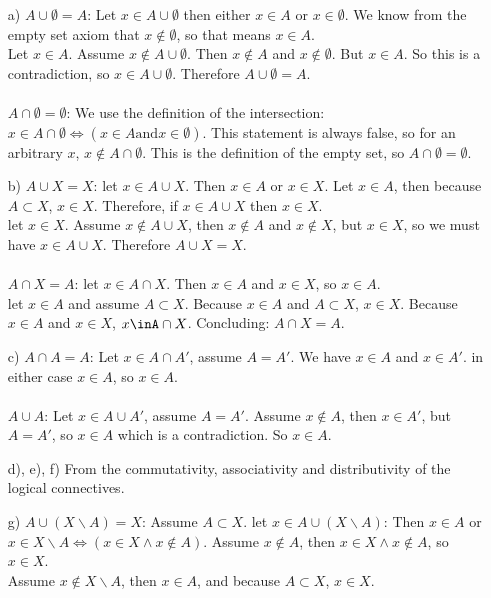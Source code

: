 \begin{itemize}
	\item[a)] $A\cup\emptyset = A$: Let $x\in A\cup\emptyset$ then either $x\in A$ or $x \in\emptyset$. We know from the empty set axiom that $x\notin\emptyset$, so that means $x\in A$.\\
		Let $x\in A$. Assume $x\notin A\cup\emptyset$. Then $x\notin A$ and $x\notin\emptyset$. But $x\in A$. So this is a contradiction, so $x\in A\cup\emptyset$. Therefore $A\cup\emptyset = A$.\\\\
	$A\cap\emptyset = \emptyset$: We use the definition of the intersection: $x\in A\cap\emptyset \Leftrightarrow (x\in A \text{and} x\in\emptyset)$. This statement is always false, so for an arbitrary $x$, $x\notin A\cap\emptyset$. This is the definition of the empty set, so $A\cap\emptyset = \emptyset$.
	\item[b)] $A\cup X = X$: let $x\in A\cup X$. Then $x\in A$ or $x\in X$. Let $x\in A$, then because $A\subset X$, $x\in X$. Therefore, if $x\in A\cup X$ then $x \in X$.\\
		let $x\in X$. Assume $x\notin A\cup X$, then $x\notin A$ and $x\notin X$, but $x\in X$, so we must have $x\in A\cup X$. Therefore $A\cup X = X$.\\\\
		$A\cap X = A$: let $x\in A\cap X$. Then $x\in A$ and $x\in X$, so $x\in A$.\\
		let $x\in A$ and assume $A\subset X$. Because $x\in A$ and $A\subset X$, $x\in X$. Because $x\in A$ and $x\in X$, $x\inA\cap X$. Concluding: $A\cap X = A$.
	\item[c)] $A\cap A = A$: Let $x\in A\cap A'$, assume $A=A'$. We have $x\in A$ and $x\in A'$. in either case $x\in A$, so $x\in A$.\\\\
		$A\cup A$: Let $x\in A\cup A'$, assume $A=A'$. Assume $x\notin A$, then $x\in A'$, but $A = A'$, so $x\in A$ which is a contradiction. So $x\in A$.
		\item[d), e), f)] From the commutativity, associativity and distributivity of the logical connectives.
	\item[g)] $A\cup(X\backslash A)=X$: Assume $A\subset X$. let $x\in A\cup(X\backslash A)$: Then $x\in A$ or $x\in X\backslash A \Leftrightarrow (x\in X \wedge x\notin A)$. Assume $x\notin A$, then $x\in X \wedge x\notin A$, so $x\in X$. \\
		Assume $x\notin X\backslash A$, then $x\in A$, and because $A\subset X$, $x\in X$.\\

\end{itemize}
